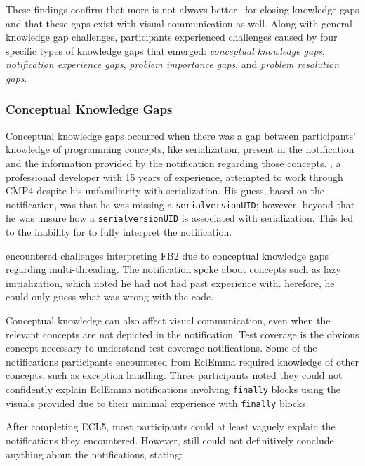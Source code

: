 These findings confirm that more is not always better~\cite{Nienaltowski:2008:Compiler} for closing knowledge gaps and that these gaps exist with visual communication as well.
Along with general knowledge gap challenges, participants experienced challenges caused by four specific types of knowledge gaps that emerged: \textit{conceptual knowledge gaps}, \textit{notification experience gaps}, \textit{problem importance gaps}, and \textit{problem resolution gaps}.

\subsubsection{Conceptual Knowledge Gaps}\label{subsec:concept}
Conceptual knowledge gaps occurred when there was a gap between participants' knowledge of programming concepts, 
like serialization, present in the notification and the information provided by the notification regarding those concepts. 
, a professional developer with 15 years of experience, attempted to work through 
CMP4 despite his unfamiliarity with serialization. 
His guess, based on the notification, was that he was missing a \texttt{serialversionUID}; 
however, beyond that he was unsure how a \texttt{serialversionUID} is associated with serialization. 
This led to the inability for  to fully interpret the notification.

 encountered challenges interpreting FB2 due to conceptual knowledge gaps regarding multi-threading. 
The notification spoke about concepts such as lazy initialization, which  noted he had not had past experience with. 
herefore, he could only guess what was wrong with the code.

Conceptual knowledge can also affect visual communication, even when the relevant concepts are not depicted in the notification. Test coverage is the obvious concept necessary to understand test coverage notifications. 
Some of the notifications participants encountered from EclEmma required knowledge of other concepts, such as exception handling. 
Three participants noted they could not confidently explain EclEmma notifications involving \texttt{finally} blocks using the visuals provided due to their minimal experience with \texttt{finally} blocks.

After completing ECL5, most participants could at least vaguely explain the notifications they encountered. 
However,  still could not definitively conclude anything about the notifications, stating: 


